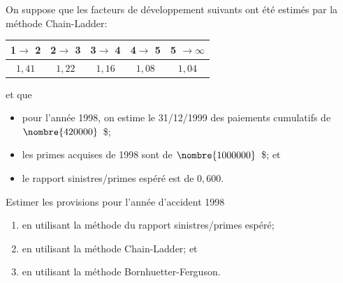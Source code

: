 \begin{exemple}
  On suppose que les facteurs de développement suivants ont été
  estimés par la méthode Chain-Ladder:
  \begin{center}
    \begin{tabular}{|c c c c c|}\hline
      1$\rightarrow$ 2 &  2$\rightarrow$ 3 &  3$\rightarrow$ 4 &  4$\rightarrow$ 5  &5 $\rightarrow  \infty$  \\ \hline
      $1,41$ & $1,22$ & $1,16$ & $1,08$ & $1,04$ \\ \hline
    \end{tabular}
  \end{center}
  et que
  \begin{itemize}
  \item pour l'année 1998, on estime le 31/12/1999 des paiements
    cumulatifs de $\nombre{420 000}$~\$;
  \item les primes acquises de 1998 sont de $\nombre{1 000 000}$~\$;
    et
  \item le rapport sinistres/primes espéré est de $0,600$.
  \end{itemize}
  Estimer les provisions pour l'année d'accident 1998
  \begin{enumerate}
  \item en utilisant la méthode du rapport sinistres/primes espéré;
  \item en utilisant la méthode Chain-Ladder; et
  \item en utilisant la méthode Bornhuetter-Ferguson.
  \end{enumerate}


\end{exemple}
